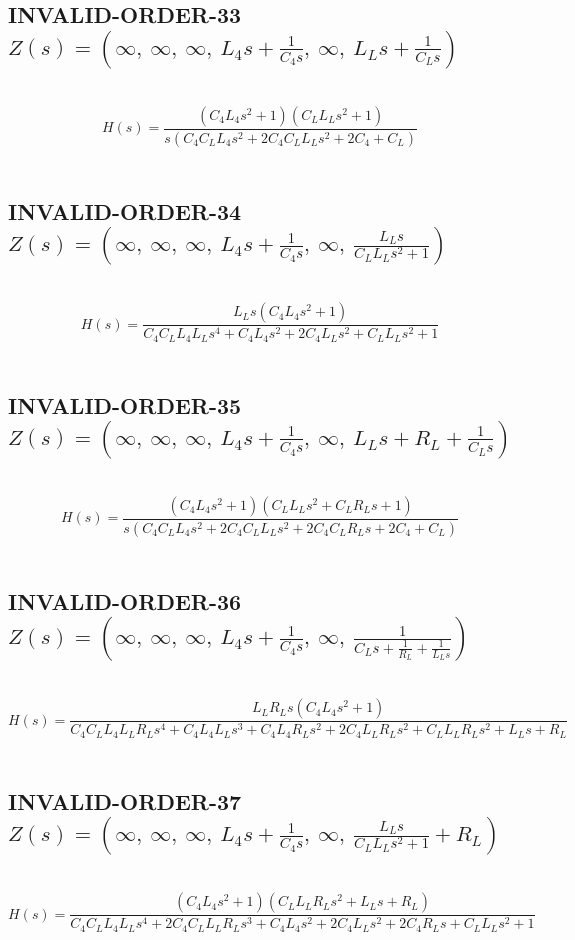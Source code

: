 \documentclass{article}
\begin{document}
\subsection{INVALID-ORDER-33 $Z(s) = \left( \infty, \  \infty, \  \infty, \  L_{4} s + \frac{1}{C_{4} s}, \  \infty, \  L_{L} s + \frac{1}{C_{L} s}\right)$ } \ 
\textbf{\[H(s) = \frac{\left(C_{4} L_{4} s^{2} + 1\right) \left(C_{L} L_{L} s^{2} + 1\right)}{s \left(C_{4} C_{L} L_{4} s^{2} + 2 C_{4} C_{L} L_{L} s^{2} + 2 C_{4} + C_{L}\right)}\] } \ 
\subsection{INVALID-ORDER-34 $Z(s) = \left( \infty, \  \infty, \  \infty, \  L_{4} s + \frac{1}{C_{4} s}, \  \infty, \  \frac{L_{L} s}{C_{L} L_{L} s^{2} + 1}\right)$ } \ 
\textbf{\[H(s) = \frac{L_{L} s \left(C_{4} L_{4} s^{2} + 1\right)}{C_{4} C_{L} L_{4} L_{L} s^{4} + C_{4} L_{4} s^{2} + 2 C_{4} L_{L} s^{2} + C_{L} L_{L} s^{2} + 1}\] } \ 
\subsection{INVALID-ORDER-35 $Z(s) = \left( \infty, \  \infty, \  \infty, \  L_{4} s + \frac{1}{C_{4} s}, \  \infty, \  L_{L} s + R_{L} + \frac{1}{C_{L} s}\right)$ } \ 
\textbf{\[H(s) = \frac{\left(C_{4} L_{4} s^{2} + 1\right) \left(C_{L} L_{L} s^{2} + C_{L} R_{L} s + 1\right)}{s \left(C_{4} C_{L} L_{4} s^{2} + 2 C_{4} C_{L} L_{L} s^{2} + 2 C_{4} C_{L} R_{L} s + 2 C_{4} + C_{L}\right)}\] } \ 
\subsection{INVALID-ORDER-36 $Z(s) = \left( \infty, \  \infty, \  \infty, \  L_{4} s + \frac{1}{C_{4} s}, \  \infty, \  \frac{1}{C_{L} s + \frac{1}{R_{L}} + \frac{1}{L_{L} s}}\right)$ } \ 
\textbf{\[H(s) = \frac{L_{L} R_{L} s \left(C_{4} L_{4} s^{2} + 1\right)}{C_{4} C_{L} L_{4} L_{L} R_{L} s^{4} + C_{4} L_{4} L_{L} s^{3} + C_{4} L_{4} R_{L} s^{2} + 2 C_{4} L_{L} R_{L} s^{2} + C_{L} L_{L} R_{L} s^{2} + L_{L} s + R_{L}}\] } \ 
\subsection{INVALID-ORDER-37 $Z(s) = \left( \infty, \  \infty, \  \infty, \  L_{4} s + \frac{1}{C_{4} s}, \  \infty, \  \frac{L_{L} s}{C_{L} L_{L} s^{2} + 1} + R_{L}\right)$ } \ 
\textbf{\[H(s) = \frac{\left(C_{4} L_{4} s^{2} + 1\right) \left(C_{L} L_{L} R_{L} s^{2} + L_{L} s + R_{L}\right)}{C_{4} C_{L} L_{4} L_{L} s^{4} + 2 C_{4} C_{L} L_{L} R_{L} s^{3} + C_{4} L_{4} s^{2} + 2 C_{4} L_{L} s^{2} + 2 C_{4} R_{L} s + C_{L} L_{L} s^{2} + 1}\] } \ 
\end{document}
